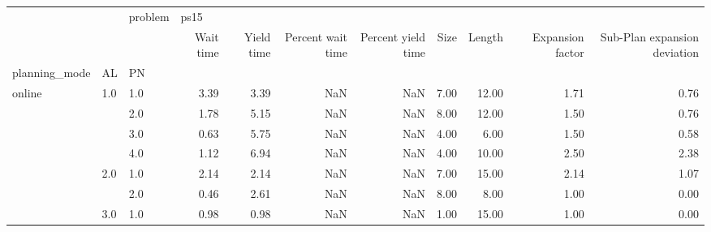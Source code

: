 \begin{tabular}{lllrrrrrrrr}
\toprule
       &     & problem & \multicolumn{8}{l}{ps15} \\
       &     & {} & Wait time & Yield time & Percent wait time & Percent yield time & Size & Length & Expansion factor & Sub-Plan expansion deviation \\
planning\_mode & AL & PN &           &            &                   &                    &      &        &                  &                              \\
\midrule
online & 1.0 & 1.0 &      3.39 &       3.39 &               NaN &                NaN & 7.00 &  12.00 &             1.71 &                         0.76 \\
       &     & 2.0 &      1.78 &       5.15 &               NaN &                NaN & 8.00 &  12.00 &             1.50 &                         0.76 \\
       &     & 3.0 &      0.63 &       5.75 &               NaN &                NaN & 4.00 &   6.00 &             1.50 &                         0.58 \\
       &     & 4.0 &      1.12 &       6.94 &               NaN &                NaN & 4.00 &  10.00 &             2.50 &                         2.38 \\
       & 2.0 & 1.0 &      2.14 &       2.14 &               NaN &                NaN & 7.00 &  15.00 &             2.14 &                         1.07 \\
       &     & 2.0 &      0.46 &       2.61 &               NaN &                NaN & 8.00 &   8.00 &             1.00 &                         0.00 \\
       & 3.0 & 1.0 &      0.98 &       0.98 &               NaN &                NaN & 1.00 &  15.00 &             1.00 &                         0.00 \\
\bottomrule
\end{tabular}

